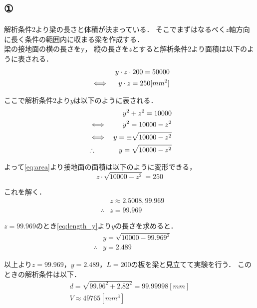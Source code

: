 \subsection{①}
  解析条件2より梁の長さと体積が決まっている．
  そこでまずはなるべく$z$軸方向に長く条件の範囲内に収まる梁を作成する．\\\indent
  梁の接地面の横の長さをy，
  縦の長さを$z$とすると解析条件2より面積は以下のように表される．
  \begin{eqnarray}
    && y \cdot z \cdot 200 = 50000 \notag \\
    &\iff& y \cdot z = 250[mm^2] \label{eq:area}
  \end{eqnarray}
  
  ここで解析条件2より$y$は以下のように表される．
  \begin{eqnarray}
    && y^2 + z^2 = 10000 \notag \\
    &\iff& y^2 = 10000 - z^2 \notag \\
    &\iff& y = \pm \sqrt{10000-z^2} \notag \\
    &\therefore& y = \sqrt{10000-z^2} \label{eq:length_y}
  \end{eqnarray}

  よって\eqref{eq:area}より接地面の面積は以下のように変形できる，
  \begin{equation*}
    z \cdot \sqrt{10000-z^2} = 250
  \end{equation*}

  これを解く．
  \begin{eqnarray*}
    &&z  \approx 2.5008, 99.969 \\
    &\therefore &z = 99.969
  \end{eqnarray*}

  $z = 99.969$のとき\eqref{eq:length_y}より$y$の長さを求めると．\\\indent
  \begin{eqnarray*}
    && y = \sqrt{10000-99.969^2} \\
    &\therefore& y = 2.489
  \end{eqnarray*}
  
  以上より$z = 99.969，y = 2.489，L = 200$の板を梁と見立てて実験を行う．
  このときの解析条件は以下．
  \begin{gather*}
    d = \sqrt{99.96^2 + 2.82^2} = 99.99998[mm] \\
    V \approx 49765[mm^3]
  \end{gather*}

